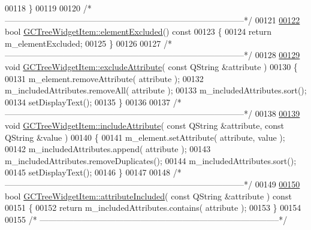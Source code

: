 \begin{DoxyCode}
00118 \}
00119 
00120 \textcolor{comment}{/*
      --------------------------------------------------------------------------------------*/}
00121 
\hypertarget{gctreewidgetitem_8cpp_source_l00122}{}\hyperlink{class_g_c_tree_widget_item_a9ea36ae7110324b227abea2036063b96}{00122} \textcolor{keywordtype}{bool} \hyperlink{class_g_c_tree_widget_item_a9ea36ae7110324b227abea2036063b96}{GCTreeWidgetItem::elementExcluded}()\textcolor{keyword}{ const}
00123 \textcolor{keyword}{}\{
00124   \textcolor{keywordflow}{return} m\_elementExcluded;
00125 \}
00126 
00127 \textcolor{comment}{/*
      --------------------------------------------------------------------------------------*/}
00128 
\hypertarget{gctreewidgetitem_8cpp_source_l00129}{}\hyperlink{class_g_c_tree_widget_item_a76e60292eec635fd2e6df27a3e162e16}{00129} \textcolor{keywordtype}{void} \hyperlink{class_g_c_tree_widget_item_a76e60292eec635fd2e6df27a3e162e16}{GCTreeWidgetItem::excludeAttribute}( \textcolor{keyword}{const} QString &attribute )
00130 \{
00131   m\_element.removeAttribute( attribute );
00132   m\_includedAttributes.removeAll( attribute );
00133   m\_includedAttributes.sort();
00134   setDisplayText();
00135 \}
00136 
00137 \textcolor{comment}{/*
      --------------------------------------------------------------------------------------*/}
00138 
\hypertarget{gctreewidgetitem_8cpp_source_l00139}{}\hyperlink{class_g_c_tree_widget_item_a3f1c09758031e2a8fc1ac9336697b3d9}{00139} \textcolor{keywordtype}{void} \hyperlink{class_g_c_tree_widget_item_a3f1c09758031e2a8fc1ac9336697b3d9}{GCTreeWidgetItem::includeAttribute}( \textcolor{keyword}{const} QString &attribute, \textcolor{keyword}{const} 
      QString &value )
00140 \{
00141   m\_element.setAttribute( attribute, value );
00142   m\_includedAttributes.append( attribute );
00143   m\_includedAttributes.removeDuplicates();
00144   m\_includedAttributes.sort();
00145   setDisplayText();
00146 \}
00147 
00148 \textcolor{comment}{/*
      --------------------------------------------------------------------------------------*/}
00149 
\hypertarget{gctreewidgetitem_8cpp_source_l00150}{}\hyperlink{class_g_c_tree_widget_item_a91d71330acb400242d45b6d74c7e0f87}{00150} \textcolor{keywordtype}{bool} \hyperlink{class_g_c_tree_widget_item_a91d71330acb400242d45b6d74c7e0f87}{GCTreeWidgetItem::attributeIncluded}( \textcolor{keyword}{const} QString &attribute )\textcolor{keyword}{ const}
00151 \textcolor{keyword}{}\{
00152   \textcolor{keywordflow}{return} m\_includedAttributes.contains( attribute );
00153 \}
00154 
00155 \textcolor{comment}{/*
      --------------------------------------------------------------------------------------*/}

\end{DoxyCode}
